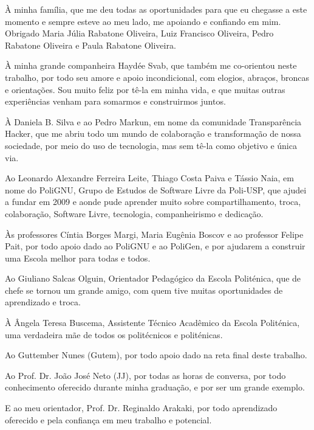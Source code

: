 À minha família, que me deu todas as oportunidades para que eu chegasse a este momento e sempre esteve ao meu lado, me apoiando e confiando em mim. Obrigado Maria Júlia Rabatone Oliveira, Luiz Francisco Oliveira, Pedro Rabatone Oliveira e Paula Rabatone Oliveira.

À minha grande companheira Haydée Svab, que também me co-orientou neste trabalho, por todo seu amore e apoio incondicional, com elogios, abraços, broncas e orientações. Sou muito feliz por tê-la em minha vida, e que muitas outras experiências venham para somarmos e construirmos juntos.

À Daniela B. Silva e ao Pedro Markun, em nome da comunidade Transparência Hacker, que me abriu todo um mundo de colaboração e transformação de nossa sociedade, por meio do uso de tecnologia, mas sem tê-la como objetivo e única via.

Ao Leonardo Alexandre Ferreira Leite, Thiago Costa Paiva e Tássio Naia, em nome do PoliGNU, Grupo de Estudos de Software Livre da Poli-USP, que ajudei a fundar em 2009 e aonde pude aprender muito sobre compartilhamento, troca, colaboração, Software Livre, tecnologia, companheirismo e dedicação.

Às professores Cíntia Borges Margi, Maria Eugênia Boscov e ao professor Felipe Pait, por todo apoio dado ao PoliGNU e ao PoliGen, e por ajudarem a construir uma Escola melhor para todas e todos.

Ao Giuliano Salcas Olguin, Orientador Pedagógico da Escola Politénica, que de chefe se tornou um grande amigo, com quem tive muitas oportunidades de aprendizado e troca.

À Ângela Teresa Buscema, Assistente Técnico Acadêmico da Escola Politénica, uma verdadeira mãe de todos os politécnicos e politénicas.

Ao Guttember Nunes (Gutem), por todo apoio dado na reta final deste trabalho.

Ao Prof. Dr. João José Neto (JJ), por todas as horas de conversa, por todo conhecimento oferecido durante minha graduação, e por ser um grande exemplo.

E ao meu orientador, Prof. Dr. Reginaldo Arakaki, por todo aprendizado oferecido e pela confiança em meu trabalho e potencial.